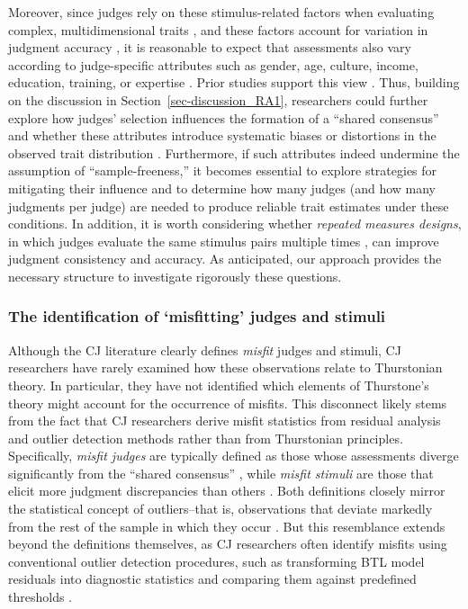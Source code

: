 \documentclass[
  authoryear,
  review,
  1p]{elsarticle}
\begin{document}
Moreover, since judges rely on these stimulus-related factors when
evaluating complex, multidimensional traits
\citep{vanDaal_et_al_2016, Lesterhuis_et_al_2018, Chambers_et_al_2022},
and these factors account for variation in judgment accuracy
\citep{Gill_et_al_2013, vanDaal_et_al_2017, vanDaal_2020, Gijsen_et_al_2021},
it is reasonable to expect that assessments also vary according to
judge-specific attributes such as gender, age, culture, income,
education, training, or expertise \citep{Kelly_et_al_2022}. Prior
studies support this view
\citep{Bartholomew_et_al_2020a, McMahon_et_al_2015}. Thus, building on
the discussion in Section~\ref{sec-discussion_RA1}, researchers could
further explore how judges' selection influences the formation of a
``shared consensus'' and whether these attributes introduce systematic
biases or distortions in the observed trait distribution
\citep{Deffner_et_al_2022}. Furthermore, if such attributes indeed
undermine the assumption of ``sample-freeness,'' it becomes essential to
explore strategies for mitigating their influence and to determine how
many judges (and how many judgments per judge) are needed to produce
reliable trait estimates under these conditions. In addition, it is
worth considering whether \emph{repeated measures designs}, in which
judges evaluate the same stimulus pairs multiple times
\citep{Lawson_2015}, can improve judgment consistency and accuracy. As
anticipated, our approach provides the necessary structure to
investigate rigorously these questions.

\subsubsection{The identification of `misfitting' judges and
stimuli}\label{sec-discussion_RA3}

Although the CJ literature clearly defines \emph{misfit} judges and
stimuli, CJ researchers have rarely examined how these observations
relate to Thurstonian theory. In particular, they have not identified
which elements of Thurstone's theory might account for the occurrence of
misfits. This disconnect likely stems from the fact that CJ researchers
derive misfit statistics from residual analysis and outlier detection
methods rather than from Thurstonian principles. Specifically,
\emph{misfit judges} are typically defined as those whose assessments
diverge significantly from the ``shared consensus''
\citep{Pollitt_2012a, Pollitt_2012b, vanDaal_et_al_2016, Goossens_et_al_2018, Wu_et_al_2022},
while \emph{misfit stimuli} are those that elicit more judgment
discrepancies than others
\citep{Pollitt_2004, Pollitt_2012a, Pollitt_2012b, Goossens_et_al_2018}.
Both definitions closely mirror the statistical concept of
outliers--that is, observations that deviate markedly from the rest of
the sample in which they occur \citep{Grubbs_1969}. But this resemblance
extends beyond the definitions themselves, as CJ researchers often
identify misfits using conventional outlier detection procedures, such
as transforming BTL model residuals into diagnostic statistics and
comparing them against predefined thresholds
\citep{Pollitt_2012a, Pollitt_2012b, Wu_et_al_2022}.
\end{document}
